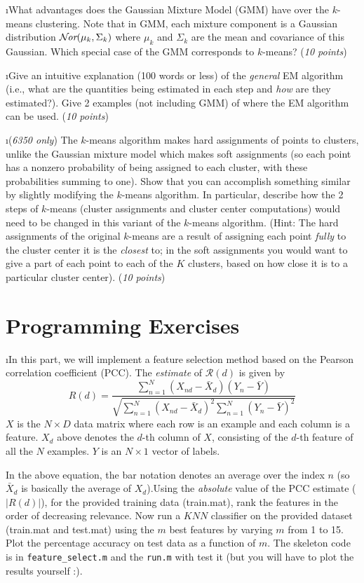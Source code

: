 \documentclass[fleqn]{article}
\begin{document}
\i What advantages does the Gaussian Mixture Model (GMM) have over
the $k$-means clustering. Note that in GMM, each mixture component is a 
Gaussian distribution $\mathcal{N}\hspace{-0.5mm}\textit{or}(\mu_k,\Sigma_k)$ where $\mu_k$ and $\Sigma_k$ 
are the mean and covariance of this Gaussian. Which special case of the 
GMM corresponds to $k$-means? (\textit{10 points})

\i Give an intuitive explanation  (100 words or less) of the \textit{general} 
EM algorithm (i.e., what are the quantities being estimated in each step and 
\textit{how} are they estimated?). Give 2 examples (not including GMM) of where the 
EM algorithm can be used. (\textit{10 points}) 

\i (\textit{6350 only}) The $k$-means algorithm makes hard assignments of 
points to clusters, unlike the Gaussian mixture model which makes soft assignments
(so each point has a nonzero probability of being assigned to each cluster, 
with these probabilities summing to one). Show that you can accomplish something 
similar by slightly modifying the $k$-means algorithm. In particular, describe how 
the 2 steps of $k$-means (cluster assignments and cluster center computations) would 
need to be changed in this variant of the $k$-means algorithm. (Hint: The hard 
assignments of the original $k$-means are a result of assigning each point 
\textit{fully} to the cluster center it is the \textit{closest} to; in the soft 
assignments you would  want to give a part of each point to each of the $K$ clusters, 
based on how close it is to a particular cluster center). (\textit{10 points})

\ene

\section{Programming Exercises}

\bee

\i In this part, we will implement a feature selection method based on
the Pearson correlation coefficient (PCC). The \textit{estimate} of 
$\mathcal{R}(d)$ is given by
\[
  R(d) = \frac{\sum_{n=1}^N (X_{nd} - \bar{X}_{d})(Y_n - \bar{Y})}
  {\sqrt{\sum_{n=1}^N (X_{nd} - \bar{X}_{d})^2\sum_{n=1}^N(Y_n - \bar{Y})^2}}
\]
$X$ is the $N\times D$ data matrix where each row is an example and each
column is a feature. $X_d$ above denotes the $d$-th column of $X$, consisting
of the $d$-th feature of all the $N$ examples. $Y$ is an $N\times 1$ vector
of labels.

In the above equation, the bar notation denotes an average over the index $n$
(so $\bar{X}_{d}$ is basically the average of $X_d$).Using the \textit{absolute} 
value of the PCC estimate ($|R(d)|$), for the provided training data (train.mat), rank the features in 
the order of decreasing relevance. Now run a $KNN$ classifier on the provided dataset
(train.mat and test.mat) using the $m$ best features by varying $m$ from 1 to 15. 
Plot the percentage accuracy on test data as a function of $m$. The skeleton code is 
in \texttt{feature\_select.m} and the \texttt{run.m} with test it (but you will have to 
plot the results yourself :). 
\end{document}
